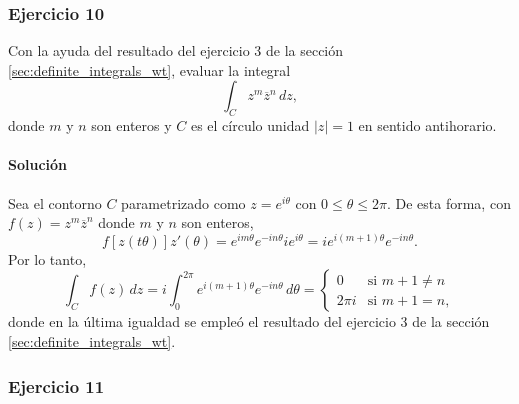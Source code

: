 \documentclass[a4paper]{report}
\begin{document}
\subsubsection{Ejercicio 10}

Con la ayuda del resultado del ejercicio 3 de la sección \ref{sec:definite_integrals_wt}, evaluar la integral 
\[
 \int_Cz^m\overline{z}^n\,dz,
\]
donde \(m\) y \(n\) son enteros y \(C\) es el círculo unidad \(|z|=1\) en sentido antihorario.

\paragraph{Solución} Sea el contorno \(C\) parametrizado como \(z=e^{i\theta}\) con \(0\leq\theta\leq2\pi\). De esta forma, con \(f(z)=z^m\overline{z}^n\) donde \(m\) y \(n\) son enteros,
\[
 f[z(t\theta)]z'(\theta)=e^{im\theta}e^{-in\theta}ie^{i\theta}=ie^{i(m+1)\theta}e^{-in\theta}.
\]
Por lo tanto,
\[
 \int_Cf(z)\,dz=i\int_0^{2\pi}e^{i(m+1)\theta}e^{-in\theta}\,d\theta=
 \left\{ 
 \begin{array}{ll}
  0 & \textrm{si }m+1\neq n\\
  2\pi i & \textrm{si }m+1=n,
 \end{array}
 \right.
\]
donde en la última igualdad se empleó el resultado del ejercicio 3 de la sección \ref{sec:definite_integrals_wt}.

\subsubsection{Ejercicio 11}
\end{document}
